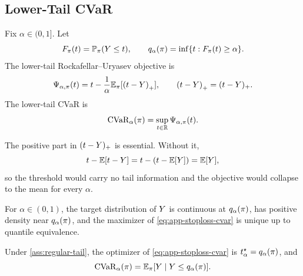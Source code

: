 \begin{twocolproof}
\end{twocolproof}

\subsection{Lower-Tail CVaR}

Fix $\alpha\in(0,1]$. Let
\[
F_\pi(t)=\mathbb{P}_\pi(Y\le t),
\qquad
q_\alpha(\pi)=\inf\{t:F_\pi(t)\ge\alpha\}.
\]
The lower-tail Rockafellar--Uryasev objective is
\begin{equation}
\Psi_{\alpha,\pi}(t)
=t-\frac{1}{\alpha}\mathbb{E}_\pi[\left(t-Y\right)_{+}],
\qquad
\left(t-Y\right)_{+}=(t-Y)_+.
\label{eq:app-stoploss-cvar}
\end{equation}
The lower-tail CVaR is
\begin{equation}
\mathrm{CVaR}_\alpha(\pi)=\sup_{t\in\mathbb{R}}\Psi_{\alpha,\pi}(t).
\label{eq:app-cvar-definition}
\end{equation}

The positive part in $(t-Y)_+$ is essential. Without it,
\[
t-\mathbb{E}[t-Y]=t-(t-\mathbb{E}[Y])=\mathbb{E}[Y],
\]
so the threshold would carry no tail information and the objective would
collapse to the mean for every $\alpha$.

\begin{assumption}
\label{ass:regular-tail}
For $\alpha\in(0,1)$, the target distribution of $Y$ is continuous at
$q_\alpha(\pi)$, has positive density near $q_\alpha(\pi)$, and the
maximizer of \cref{eq:app-stoploss-cvar} is unique up to quantile equivalence.
\end{assumption}

\begin{proposition}
\label{prop:formal-stoploss}
Under \cref{ass:regular-tail}, the optimizer of
\cref{eq:app-stoploss-cvar} is $t_\alpha^\star=q_\alpha(\pi)$, and
\[
\mathrm{CVaR}_\alpha(\pi)
=\mathbb{E}_\pi[Y\mid Y\le q_\alpha(\pi)].
\]
\end{proposition}


